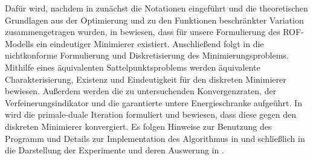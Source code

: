 Dafür wird, nachdem in  zunächst die Notationen
eingeführt und die theoretischen Grundlagen aus der Optimierung und zu den
Funktionen beschränkter Variation zusammengetragen wurden, in
 bewiesen, dass für unsere Formulierung des
ROF-Modells ein eindeutiger
Minimierer existiert.
Anschließend folgt in  die nichtkonforme Formulierung
und Diskretisierung des Minimierungsproblems. Mithilfe eines
äquivalenten Sattelpunktsproblems werden äquivalente Charakterisierung, 
Existenz und Eindeutigkeit für den diskreten Minimierer bewiesen. Außerdem
werden die zu untersuchenden Konvergenzraten, der Verfeinerungsindikator und
die garantierte untere Energieschranke aufgeührt.
In  wird die primale-duale Iteration formuliert und bewiesen,
dass diese gegen den diskreten Minimierer konvergiert. 
Es folgen Hinweise zur Benutzung des Programm und Details zur Implementation
des Algorithmus in  und schließlich in
 die Darstellung der Experimente und deren Auswerung in
.



